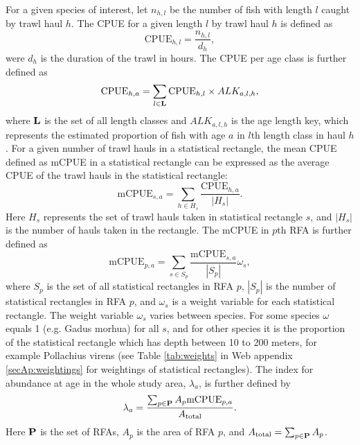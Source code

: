 \documentclass[a4paper 12pt]{article}
\numberwithin{equation}{section}
\begin{document}
For a given species of interest, let $n_{h,l}$ be the number of fish with length $l$ caught by trawl haul $h$. The CPUE for a given length $l$ by trawl haul $h$ is defined as 
\begin{equation}\label{eq:cpueHaul}
\mathrm{CPUE}_{h,l} =\frac{n_{h,l}}{d_h},
\end{equation}
were $d_h$ is the duration of the trawl in hours. The CPUE per age class is further defined as
\begin{equation}\label{eq:cpueALK}
\mathrm{CPUE}_{h,a} =\sum_{l \in {\bf L}}\mathrm{CPUE}_{h, l} \times ALK_{a,l,h},
\end{equation}
where ${\bf L}$ is the set of all length classes and $ALK_{a,l,h}$ is the age length key, which represents the estimated proportion of fish with age $a$ in $l$th length class in haul $h$. For a given number of trawl hauls in a statistical rectangle, the mean CPUE defined as  mCPUE  in a statistical rectangle can be expressed as the average CPUE of the trawl hauls in the statistical rectangle:
\begin{equation}\label{eq:cpueRec}
\mathrm{mCPUE}_{s,a} =\sum_{h \in H_{s}}\frac{\mathrm{CPUE}_{h,a}}{|H_{s}|}.
\end{equation}
Here $H_{s}$ represents the set of trawl hauls taken in statistical rectangle $s$, and $|H_{s}|$ is the number of hauls taken in the rectangle. The mCPUE in $p$th RFA is further defined as
\begin{equation}\label{eq:cpueRFA}
\mathrm{mCPUE}_{p,a} = \sum_{s \in S_{p}} \frac{\mathrm{mCPUE}_{s,a}}{|S_{p}|} \omega_s,
\end{equation}
where $S_{p}$ is the set of all statistical rectangles in RFA $p$, $|S_{p}|$ is the number of statistical rectangles in RFA $p$, and $\omega_s$ is a weight variable for each statistical rectangle. The weight variable $\omega_s$ varies between species. For some species $\omega$ equals 1 (e.g. Gadus morhua) for all $s$, and for other species it is the proportion of the statistical rectangle which has depth between 10 to 200 meters, for example Pollachius virens (see Table \ref{tab:weights} in Web appendix \ref{secAp:weightings}  for weightings of statistical rectangles).  The index for abundance at age in the whole study area, $\lambda_{a}$, is further defined by
\begin{equation}
\lambda_{a}= \frac{\sum_{p\in {\bf P}} A_{p}  \mathrm{mCPUE}_{p,a}}{A_{\text{total}}}.
\label{abundanceestimatornorthsea}
\end{equation}
Here ${\bf P}$ is the set of RFAs, $A_p$ is the area of RFA $p$, and $A_{\text{total}} = \sum_{p\in {\bf P}} A_{p}$.
 
\end{document}
